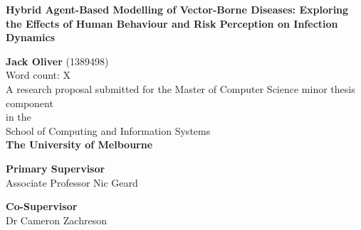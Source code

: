 \documentclass[a4paper, titlepage, 12pt]{article}
\newcommand{\thesisTitle}{Hybrid Agent-Based Modelling of Vector-Borne Diseases: Exploring the Effects of Human Behaviour and Risk Perception on Infection Dynamics}
\newcommand{\name}{Jack Oliver}
\newcommand{\timeFrame}{School of Computing and Information Systems}
\newcommand{\school}{The University of Melbourne}
\newcommand{\supervisor}{Associate Professor Nic Geard}
\newcommand{\advisor}{Dr Cameron Zachreson}
\begin{document}
\begin{singlespace} %
\begin{titlepage}
\begin{center}


\vspace*{1.5cm}

\Large{\textbf{\thesisTitle}}

\vspace{2.5cm}

\large{\textbf{\name} (1389498) \\ Word count: X} \\
\vspace{2cm}
\large{A research proposal submitted for the Master of Computer Science minor thesis component \\}
\vspace{.5cm}
\large{in the} \\
\large{\timeFrame} \\ 
\large{\textbf{\school}}

\vspace{2cm}

\large{\textbf{Primary Supervisor}}\\
\supervisor\\
\vspace{1.5cm}

\textbf{Co-Supervisor}\\
\advisor\\
\end{center}
\end{titlepage}
\end{singlespace}

\tableofcontents
\clearpage



% 
% 
% 

\clearpage
\end{document}
